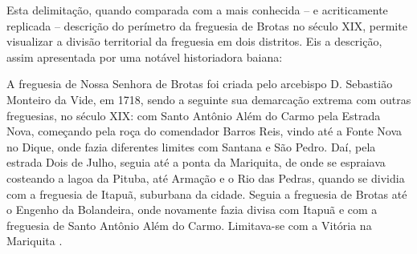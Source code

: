 Esta delimitação, quando comparada com a mais conhecida -- e acriticamente replicada -- descrição do perímetro da freguesia de Brotas no século XIX, permite visualizar a divisão territorial da freguesia em dois distritos. Eis a descrição, assim apresentada por uma notável historiadora baiana:

\begin{citacao}\label{nascimentodescreve}
A freguesia de Nossa Senhora de Brotas foi criada pelo arcebispo D. Sebastião Monteiro da Vide, em 1718, sendo a seguinte sua demarcação extrema com outras freguesias, no século XIX: com Santo Antônio Além do Carmo pela Estrada Nova, começando pela roça do comendador Barros Reis, vindo até a Fonte Nova no Dique, onde fazia diferentes limites com Santana e São Pedro. Daí, pela estrada Dois de Julho, seguia até a ponta da Mariquita, de onde se espraiava costeando a lagoa da Pituba, até Armação e o Rio das Pedras, quando se dividia com a freguesia de Itapuã, suburbana da cidade. Seguia a freguesia de Brotas até o Engenho da Bolandeira, onde novamente fazia divisa com Itapuã e com a freguesia de Santo Antônio Além do Carmo. Limitava-se com a Vitória na Mariquita \cite[p.~58]{NASCIMENTO2007}.
\end{citacao}

